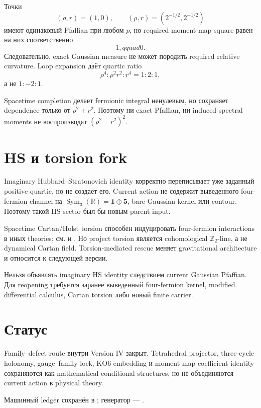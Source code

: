 Точки
\begin{equation}
 (\rho,r)=(1,0),
 \qquad
 (\rho,r)=(2^{-1/2},2^{-1/2})
\end{equation}
имеют одинаковый Pfaffian при любом \(p\), но required moment-map square
равен на них соответственно
\begin{equation}
 1,qquad0.
\end{equation}
Следовательно, exact Gaussian measure не может породить required relative
curvature. Loop expansion даёт quartic ratio
\begin{equation}
 \rho^4:\rho^2r^2:r^4=1:2:1,
\end{equation}
а не \(1:-2:1\).

\begin{theorem}
Spacetime completion делает fermionic integral ненулевым, но сохраняет
dependence только от \(\rho^2+r^2\). Поэтому ни exact Pfaffian, ни induced
spectral moments не воспроизводят
\((\rho^2-r^2)^2\).
\end{theorem}

\section{HS и torsion fork}

Imaginary Hubbard--Stratonovich identity корректно переписывает уже заданный
positive quartic, но не создаёт его. Current action не содержит выведенного
four-fermion channel на
\(\operatorname{Sym}_3(\mathbb R)=\mathbf1\oplus\mathbf5\), bare Gaussian
kernel или contour. Поэтому такой HS sector был бы новым parent input.

Spacetime Cartan/Holst torsion способен индуцировать four-fermion
interactions в иных theories; см.  и
. Но project torsion является cohomological
\(\mathbb Z_2\)-line, а не dynamical Cartan field. Torsion-mediated rescue
меняет gravitational architecture и относится к следующей версии.

\begin{nogocriterion}[Pfaffian-to-HS no-go]
Нельзя объявлять imaginary HS identity следствием current Gaussian
Pfaffian. Для reopening требуется заранее выведенный four-fermion kernel,
modified differential calculus, Cartan torsion либо новый finite carrier.
\end{nogocriterion}

\section{Статус}

Family--defect route внутри Version IV закрыт. Tetrahedral projector,
three-cycle holonomy, gauge--family lock, KO6 embedding и moment-map
coefficient identity сохраняются как mathematical conditional structures,
но не объединяются current action в physical theory.

Машинный ledger сохранён в
;
генератор ---
.